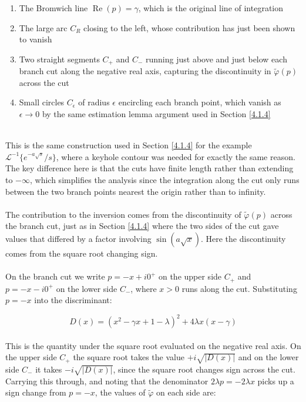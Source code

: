 \begin{enumerate}
    \item The Bromwich line $\operatorname{Re}(p) = \gamma$, which is the original 
    line of integration
    \item The large arc $C_R$ closing to the left, whose contribution has just 
    been shown to vanish
    \item Two straight segments $C_+$ and $C_-$ running just above and just below 
    each branch cut along the negative real axis, capturing the discontinuity in 
    $\tilde{\varphi}(p)$ across the cut
    \item Small circles $C_\epsilon$ of radius $\epsilon$ encircling each branch 
    point, which vanish as $\epsilon \to 0$ by the same estimation lemma argument 
    used in Section \ref{4.1.4}
\end{enumerate}
\\
This is the same construction used in Section \ref{4.1.4} for the example 
$\mathcal{L}^{-1}\{e^{-a\sqrt{s}}/s\}$, where a keyhole contour was needed for 
exactly the same reason. The key difference here is that the cuts have finite 
length rather than extending to $-\infty$, which simplifies the analysis since 
the integration along the cut only runs between the two branch points nearest 
the origin rather than to infinity.
\\
\\
The contribution to the inversion comes from the discontinuity of $\tilde{\varphi}(p)$ 
across the branch cut, just as in Section \ref{4.1.4} where the two sides of the cut 
gave values that differed by a factor involving $\sin(a\sqrt{x})$. Here the 
discontinuity comes from the square root changing sign.
\\
\\
On the branch cut we write $p = -x + i0^+$ on the upper side $C_+$ and 
$p = -x - i0^+$ on the lower side $C_-$, where $x > 0$ runs along the cut. 
Substituting $p = -x$ into the discriminant:

\begin{equation}
    D(x) = (x^2 - \gamma x + 1 - \lambda)^2 + 4\lambda x(x - \gamma)
    \label{eq:discriminant}
\end{equation}
\\
This is the quantity under the square root evaluated on the negative real axis. 
On the upper side $C_+$ the square root takes the value $+i\sqrt{|D(x)|}$ and 
on the lower side $C_-$ it takes $-i\sqrt{|D(x)|}$, since the square root 
changes sign across the cut. Carrying this through, and noting that the 
denominator $2\lambda p = -2\lambda x$ picks up a sign change from $p = -x$, 
the values of $\tilde{\varphi}$ on each side are:

